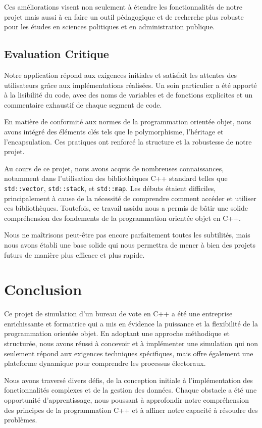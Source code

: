 \documentclass[12pt]{article} %
\begin{document}
	Ces améliorations visent non seulement à étendre les fonctionnalités de notre projet mais aussi à en faire un outil pédagogique et de recherche plus robuste pour les études en sciences politiques et en administration publique.
	
	\subsection*{Evaluation Critique}
	Notre application répond aux exigences initiales et satisfait les attentes des utilisateurs grâce aux implémentations réalisées. Un soin particulier a été apporté à la lisibilité du code, avec des noms de variables et de fonctions explicites et un commentaire exhaustif de chaque segment de code.
	
	En matière de conformité aux normes de la programmation orientée objet, nous avons intégré des éléments clés tels que le polymorphisme, l'héritage et l'encapsulation. Ces pratiques ont renforcé la structure et la robustesse de notre projet.
	
	Au cours de ce projet, nous avons acquis de nombreuses connaissances, notamment dans l'utilisation des bibliothèques C++ standard telles que \texttt{std::vector}, \texttt{std::stack}, et \texttt{std::map}. Les débuts étaient difficiles, principalement à cause de la nécessité de comprendre comment accéder et utiliser ces bibliothèques. Toutefois, ce travail assidu nous a permis de bâtir une solide compréhension des fondements de la programmation orientée objet en C++.
	
	Nous ne maîtrisons peut-être pas encore parfaitement toutes les subtilités, mais nous avons établi une base solide qui nous permettra de mener à bien des projets futurs de manière plus efficace et plus rapide.
	
	\newpage
	
	\section*{Conclusion}
	Ce projet de simulation d'un bureau de vote en C++ a été une entreprise enrichissante et formatrice qui a mis en évidence la puissance et la flexibilité de la programmation orientée objet. En adoptant une approche méthodique et structurée, nous avons réussi à concevoir et à implémenter une simulation qui non seulement répond aux exigences techniques spécifiques, mais offre également une plateforme dynamique pour comprendre les processus électoraux.
	
	Nous avons traversé divers défis, de la conception initiale à l'implémentation des fonctionnalités complexes et de la gestion des données. Chaque obstacle a été une opportunité d'apprentissage, nous poussant à approfondir notre compréhension des principes de la programmation C++ et à affiner notre capacité à résoudre des problèmes.
	
\end{document}
